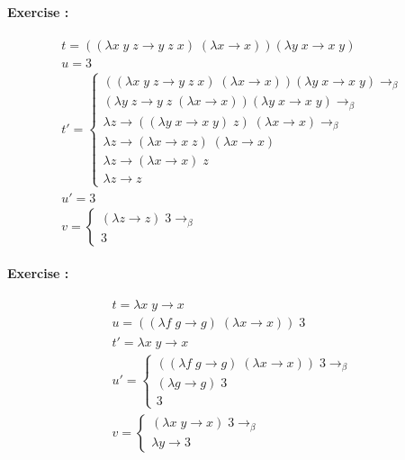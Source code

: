 \documentclass[10pt,a4paper]{article}
\newcounter{ExerciseCount}
\newcommand{\exercise}[1]{\noindent \textbf{Exercise \theExerciseCount:}
  
  \vspace{0.15cm}
 #1 \addtocounter{ExerciseCount}{1}
}
\begin{document}
\exercise{
  \begin{align*}
        \begin{array}{l}
           t = ((\lambda x \; y \; z \rightarrow y \; z \; x) \; (\lambda x \rightarrow x)) (\lambda y \; x \rightarrow x \; y)\\
           u = 3 \\
           t' = \left\lbrace
            \begin{array}{l}
            ((\lambda x \; y \; z \rightarrow y \; z \; x) \; (\lambda x \rightarrow x)) (\lambda y \; x \rightarrow x \; y) \rightarrow_\beta\\
            (\lambda y \; z \rightarrow y \; z \; (\lambda x \rightarrow x)) (\lambda y \; x \rightarrow x \; y) \rightarrow_\beta\\
            \lambda z \rightarrow ((\lambda y \; x \rightarrow x \; y) \; z) \; (\lambda x \rightarrow x) \rightarrow_{\beta}\\
            \lambda z \rightarrow (\lambda x \rightarrow x \; z) \; (\lambda x \rightarrow x)\\
            \lambda z \rightarrow (\lambda x \rightarrow x) \; z \\
            \lambda z \rightarrow z
            \end{array} \right. \\
           u'= 3 \\
           v = \left \lbrace \begin{array}{l}
              (\lambda z \rightarrow z) \; 3 \rightarrow_{\beta}\\
              3
              \end{array} \right.
         \end{array}
        \end{align*}
}
\newpage
\exercise{
  \begin{align*}
    \begin{array}{l}
       t = \lambda x \; y \rightarrow x\\
       u = ((\lambda f \; g \rightarrow g) \; (\lambda x \rightarrow x)) \; 3 \\
       t' = \lambda x \; y \rightarrow x \\
       u'= \left\lbrace \begin{array}{l}
           ((\lambda f \; g \rightarrow g) \; (\lambda x \rightarrow x)) \; 3 \rightarrow_{\beta}\\
           (\lambda g \rightarrow g) \; 3 \\
           3
           \end{array} \right. \\
       v = \left \lbrace \begin{array}{l}
           (\lambda x \; y \rightarrow x) \; 3 \rightarrow_{\beta}\\
           \lambda y \rightarrow 3
          \end{array} \right.
     \end{array}
    \end{align*}
}
\end{document}
